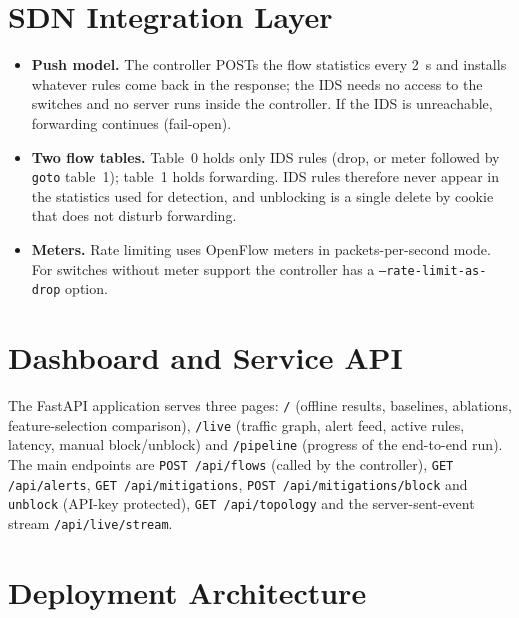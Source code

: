 \section{SDN Integration Layer}
\begin{itemize}
	\item \textbf{Push model.} The controller POSTs the flow statistics every 2~s and installs whatever rules come back in the response; the IDS needs no access to the switches and no server runs inside the controller. If the IDS is unreachable, forwarding continues (fail-open).
	\item \textbf{Two flow tables.} Table~0 holds only IDS rules (drop, or meter followed by \texttt{goto} table~1); table~1 holds forwarding. IDS rules therefore never appear in the statistics used for detection, and unblocking is a single delete by cookie that does not disturb forwarding.
	\item \textbf{Meters.} Rate limiting uses OpenFlow meters in packets-per-second mode. For switches without meter support the controller has a \texttt{--rate-limit-as-drop} option.
\end{itemize}

\section{Dashboard and Service API}
The FastAPI application serves three pages: \texttt{/} (offline results, baselines, ablations, feature-selection comparison), \texttt{/live} (traffic graph, alert feed, active rules, latency, manual block/unblock) and \texttt{/pipeline} (progress of the end-to-end run). The main endpoints are \texttt{POST /api/flows} (called by the controller), \texttt{GET /api/alerts}, \texttt{GET /api/mitigations}, \texttt{POST /api/mitigations/block} and \texttt{unblock} (API-key protected), \texttt{GET /api/topology} and the server-sent-event stream \texttt{/api/live/stream}.

\section{Deployment Architecture}

